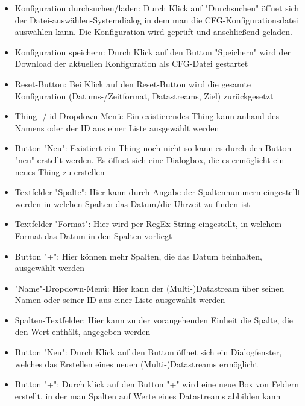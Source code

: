 \documentclass[12 pt]{article}
\begin{document}
\begin{itemize}
		\item Konfiguration durchsuchen/laden: Durch Klick auf "Durchsuchen" öffnet sich der Datei-auswählen-Systemdialog in dem man die CFG-Konfigurationsdatei auswählen kann. Die Konfiguration wird geprüft und anschließend geladen.
		\item Konfiguration speichern: Durch Klick auf den Button \string"Speichern" wird der Download der aktuellen Konfiguration als CFG-Datei gestartet
		\item Reset-Button: Bei Klick auf den Reset-Button wird die gesamte Konfiguration (Datums-/Zeitformat, Datastreams, Ziel) zurückgesetzt
		
		\item Thing- / id-Dropdown-Menü: Ein existierendes Thing kann anhand des Namens oder der ID aus einer Liste ausgewählt werden
		\item Button "Neu": Existiert ein Thing noch nicht so kann es durch den Button "neu" erstellt werden. Es öffnet sich eine Dialogbox, die es ermöglicht ein neues Thing zu erstellen
		
		\item Textfelder \string"Spalte": Hier kann durch Angabe der Spaltennummern eingestellt werden in welchen Spalten das Datum/die Uhrzeit zu finden ist
		\item Textfelder "Format": Hier wird per RegEx-String eingestellt, in welchem Format das Datum in den Spalten vorliegt
		\item Button "+": Hier können mehr Spalten, die das Datum beinhalten, ausgewählt werden
		
		\item "Name"\string-Dropdown\string-Menü: Hier kann der (Multi-)Datastream über seinen Namen oder seiner ID aus einer Liste ausgewählt werden
		\item Spalten-Textfelder: Hier kann zu der vorangehenden Einheit die Spalte, die den Wert enthält, angegeben werden
		\item Button "Neu": Durch Klick auf den Button öffnet sich ein Dialogfenster, welches das Erstellen eines neuen (Multi-)Datastreams ermöglicht
		\item Button "+": Durch klick auf den Button "+" wird eine neue Box von Feldern erstellt, in der man Spalten auf Werte eines Datastreams abbilden kann
		

\end{itemize}
\end{document}
